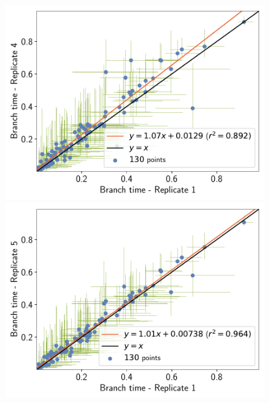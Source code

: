\documentclass{article}
\begin{document}
\begin{figure}[H]
\begin{minipage}{0.32\linewidth}
			\includegraphics[width=\linewidth, page=1]{isopods/12CDS_SiteMutSelBranchNe_Rep-1-4_BranchTime}
		\end{minipage}
		\begin{minipage}{0.32\linewidth}
			\includegraphics[width=\linewidth, page=1]{isopods/12CDS_SiteMutSelBranchNe_Rep-1-5_BranchTime}
		\end{minipage}
		\begin{minipage}{0.32\linewidth}

\end{minipage}
\end{figure}
\end{document}
